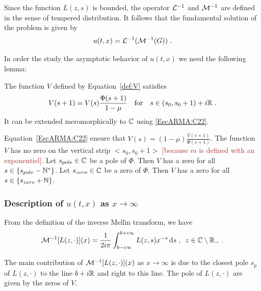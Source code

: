 \documentclass[11pt]{amsart}
\newcommand{\diff}{\,\mathrm{d}}
\newcommand{\ndr}[1]{\textcolor{brown}{[#1]}}
\begin{document}
Since the function $L(z,s)$ is bounded, the operator $\mathcal{L}^{-1}$ and $ \mathcal{M}^{-1}$ are defined in the sense of tempered distribution. It follows that the fundamental solution of the problem is given by 
    \begin{equation}
        u(t,x) = \mathcal{L}^{-1} (\mathcal{M}^{-1} (G))
        \; .
    \end{equation}
    
In order the study the asymptotic behavior of $u(t,x)$ we need the following lemma: 
\begin{lemma}The function $V$ defined by Equation~\eqref{def:V} satisfies
    \begin{equation}
        V(s+1) = V(s)\frac{\Phi(s+1)}{1-\mu}
        \quad \text{for} \quad
        s \in (s_0, s_0+1) + i\mathbb{R}
        \; .
        \label{EscARMA:C22}
    \end{equation}
It can be extended meromorphically to $\mathbb{C}$ using \eqref{EscARMA:C22}.
\end{lemma}

\begin{remark}
    Equation~\eqref{EscARMA:C22} ensure that $V(s) = (1-\mu)\frac{V(s+1)}{\Phi(s+1)}$. 
    The function $V$ has no zero on the vertical strip $<s_0, s_0+1>$ \ndr{because $m$ is defined with an exponentiel}. Let $s_{pole} \in \mathbb{C}$ be a pole of $\Phi$. Then $V$ has a zero for all $s \in \{s_{pole} - \mathbb{N}^* \}$.
    Let $s_{zero} \in \mathbb{C}$ be a zero of $\Phi$. Then $V$ has a zero for all 
    $s \in \{s_{zero} + \mathbb{N}\}$. 
\end{remark}

    
\subsubsection{Description of $u(t,x)$ as $x \to \infty$}\text{\\}

From the definition of the inverse Mellin transform, we have
\begin{equation}
    \Mcal^{-1}[L(z,\cdot)](x) = \frac{1}{2i\pi} \int_{b-i\infty}^{b+i\infty} L(z,s)x^{-s}\diff s
    \eqsepv
    z \in \CC \setminus \RR_-
    \eqfinp
\end{equation}

The main contribution of $\mathcal{M}^{-1}[L(z,\cdot)](x)$ as $x \to \infty$ is due to the closest pole $s_p$ of $L(z,\cdot)$ to the line $b+i\mathbb{R}$ and right to this line. The pole of $L(z,\cdot)$ are given by the zeros of $V$. 
\end{document}
